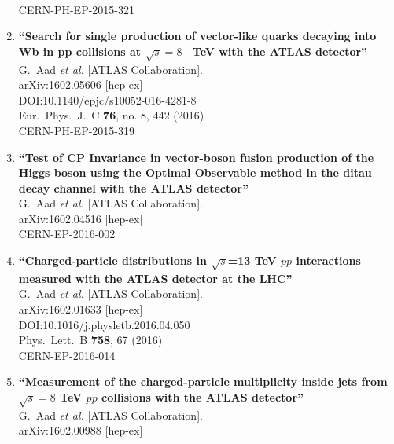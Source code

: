 \documentclass{article}
\begin{document}
\begin{enumerate}
  \\{}CERN-PH-EP-2015-321
\item%
{\bf ``Search for single production of vector-like quarks decaying into Wb in pp collisions at $\sqrt{s} = 8$  TeV with the ATLAS detector''}
  \\{}G.~Aad {\it et al.} [ATLAS Collaboration].
  \\{}arXiv:1602.05606 [hep-ex]
  \\{}DOI:10.1140/epjc/s10052-016-4281-8
  \\{}Eur.\ Phys.\ J.\ C {\bf 76}, no. 8, 442 (2016)
  \\{}CERN-PH-EP-2015-319
\item%
{\bf ``Test of CP Invariance in vector-boson fusion production of the Higgs boson using the Optimal Observable method in the ditau decay channel with the ATLAS detector''}
  \\{}G.~Aad {\it et al.} [ATLAS Collaboration].
  \\{}arXiv:1602.04516 [hep-ex]
  \\{}CERN-EP-2016-002
\item%
{\bf ``Charged-particle distributions in $\sqrt{s}$=13 TeV $pp$ interactions measured with the ATLAS detector at the LHC''}
  \\{}G.~Aad {\it et al.} [ATLAS Collaboration].
  \\{}arXiv:1602.01633 [hep-ex]
  \\{}DOI:10.1016/j.physletb.2016.04.050
  \\{}Phys.\ Lett.\ B {\bf 758}, 67 (2016)
  \\{}CERN-EP-2016-014
\item%
{\bf ``Measurement of the charged-particle multiplicity inside jets from $\sqrt{s}=8$ TeV $pp$ collisions with the ATLAS detector''}
  \\{}G.~Aad {\it et al.} [ATLAS Collaboration].
  \\{}arXiv:1602.00988 [hep-ex]

\end{enumerate}
\end{document}
